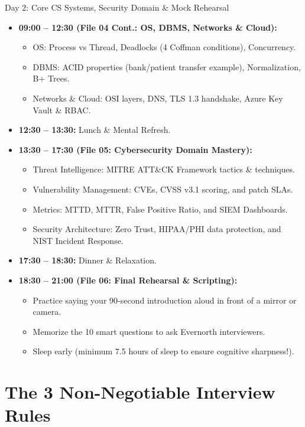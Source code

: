 \documentclass[11pt,a4paper]{article}
\begin{document}
\begin{ansbox}{Day 2: Core CS Systems, Security Domain \& Mock Rehearsal}
\begin{itemize}
    \item \textbf{09:00 -- 12:30 (File 04 Cont.: OS, DBMS, Networks \& Cloud):}
    \begin{itemize}
        \item OS: Process vs Thread, Deadlocks (4 Coffman conditions), Concurrency.
        \item DBMS: ACID properties (bank/patient transfer example), Normalization, B+ Trees.
        \item Networks \& Cloud: OSI layers, DNS, TLS 1.3 handshake, Azure Key Vault \& RBAC.
    \end{itemize}
    \item \textbf{12:30 -- 13:30:} Lunch \& Mental Refresh.
    \item \textbf{13:30 -- 17:30 (File 05: Cybersecurity Domain Mastery):}
    \begin{itemize}
        \item Threat Intelligence: MITRE ATT\&CK Framework tactics \& techniques.
        \item Vulnerability Management: CVEs, CVSS v3.1 scoring, and patch SLAs.
        \item Metrics: MTTD, MTTR, False Positive Ratio, and SIEM Dashboards.
        \item Security Architecture: Zero Trust, HIPAA/PHI data protection, and NIST Incident Response.
    \end{itemize}
    \item \textbf{17:30 -- 18:30:} Dinner \& Relaxation.
    \item \textbf{18:30 -- 21:00 (File 06: Final Rehearsal \& Scripting):}
    \begin{itemize}
        \item Practice saying your 90-second introduction aloud in front of a mirror or camera.
        \item Memorize the 10 smart questions to ask Evernorth interviewers.
        \item Sleep early (minimum 7.5 hours of sleep to ensure cognitive sharpness!).
    \end{itemize}
\end{itemize}
\end{ansbox}

\section{The 3 Non-Negotiable Interview Rules}
\end{document}
